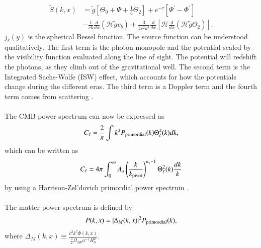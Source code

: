 \documentclass{aa}
\begin{document}
\begin{equation}
   \begin{aligned}
   \tilde{S}(k,x) &= \tilde{g}\left[ \Theta_0 + \Psi + \frac{1}{4}\Theta_2\right] + e^{-\tau} \left[\Psi^\prime-\Phi^\prime\right] \\
   &-\frac{1}{ck}\frac{d}{dx}(\mathcal{H}\tilde{g}v_b) + \frac{3}{4c^2k^2} \frac{d}{dx}
   \left[\mathcal{H}\frac{d}{dx} (\mathcal{H}\tilde{g}\Theta_2)\right]. 
   \end{aligned}
\end{equation}
$j_\ell(y)$ is the spherical Bessel function. The source function can be understood qualitatively. The first term is the photon monopole and the potential scaled by the visibility 
function evaluated along the line of sight. The potential will redshift the photons, as they climb out of the gravitational well. The second term is the Integrated 
Sachs-Wolfe (ISW) effect, which accounts for how the potentials change during the different eras. The third term is a Doppler term and the fourth term comes from scattering \cite{winther:2023}.\\
\\
The CMB power spectrum can now be expressed as 
   \begin{equation}
      C_\ell = \frac{2}{\pi}\int k^2P_{\rm primordial}(k) \Theta_\ell^2(k)dk,
   \end{equation}
which can be written as 
\begin{equation}\label{eq:m4_cell}
   C_\ell = 4\pi \int_0^{\infty} A_s \left(\frac{k}{k_{\rm pivot}}\right)^{n_s-1} \Theta_\ell^2(k) \frac{dk}{k}
\end{equation}
by using a Harrison-Zel'dovich primordial power spectrum \cite{winther:2023}.\\
\\
The matter power spectrum is defined by
\begin{equation}
   P(k,x) = |\Delta_M(k,x)|^2P_{\rm primordial}(k),
\end{equation}
where $\Delta_M(k,x) \equiv \frac{c^2k^2\Phi(k,x)}{\frac{3}{2}\Omega_{M 0} a^{-1} H_0^2}$.
\end{document}
